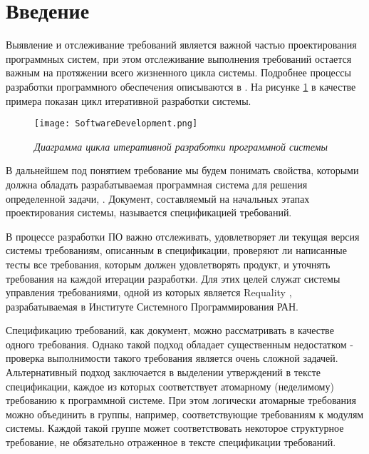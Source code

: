 \section{Введение}
\label{sec:Chapter1} 
Выявление и отслеживание требований является важной частью проектирования программных систем, при этом отслеживание выполнения требований остается важным на протяжении всего жизненного цикла системы. Подробнее процессы разработки программного обеспечения описываются в \cite{web:DevelopmentProcesses}. На рисунке \ref{intro:image1} в качестве примера показан цикл итеративной разработки системы.

\begin{figure}[h]
\begin{center}
\texttt{[image: SoftwareDevelopment.png]}
\caption{\emph{Диаграмма цикла итеративной разработки программной системы}}
\label{intro:image1}
\end{center}
\end{figure}

В дальнейшем под понятием требование мы будем понимать свойства, которыми должна обладать разрабатываемая программная система для решения определенной задачи\cite{book:Requirements}, \cite{book:SWEBOK}. Документ, составляемый на начальных этапах проектирования системы, называется спецификацией требований.

В процессе разработки ПО важно отслеживать, удовлетворяет ли текущая версия системы требованиям, описанным в спецификации, проверяют ли написанные тесты все требования, которым должен удовлетворять продукт, и уточнять требования на каждой итерации разработки. Для этих целей служат системы управления требованиями, одной из которых является Requality \cite{web:Requality}, разрабатываемая в Институте Системного Программирования РАН.

Спецификацию требований, как документ, можно рассматривать в качестве одного требования. Однако такой подход обладает существенным недостатком - проверка выполнимости такого требования является очень сложной задачей. Альтернативный подход заключается в выделении утверждений в тексте спецификации, каждое из которых соответствует атомарному (неделимому) требованию к программной системе. При этом логически атомарные требования можно объединить в группы, например, соответствующие требованиям к модулям системы. Каждой такой группе может соответствовать некоторое структурное требование, не обязательно отраженное в тексте спецификации требований.

